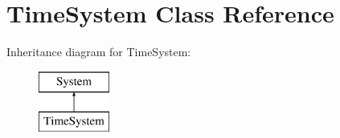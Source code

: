 \hypertarget{class_time_system}{}\section{Time\+System Class Reference}
\label{class_time_system}
Inheritance diagram for Time\+System\+:\begin{figure}[H]
\begin{center}
\leavevmode
\includegraphics[height=2.000000cm]{class_time_system}
\end{center}
\end{figure}
